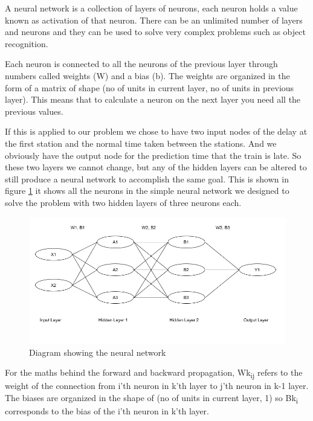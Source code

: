 \documentclass[11pt]{article}
\begin{document}
	A neural network is a collection of layers of neurons, each neuron holds a value known as activation of that neuron. There can be an unlimited number of layers and neurons and they can be used to solve very complex problems such as object recognition.
	
	Each neuron is connected to all the neurons of the previous layer through numbers called weights (W) and a bias (b). The weights are organized in the form of a matrix of shape (no of units in current layer, no of units in previous layer). This means that to calculate a neuron on the next layer you need all the previous values.
	
	If this is applied to our problem we chose to have two input nodes of the delay at the first station and the normal time taken between the stations. And we obviously have the output node for the prediction time that the train is late. So these two layers we cannot change, but any of the hidden layers can be altered to still produce a neural network to accomplish the same goal. This is shown in figure \ref{Img:NNDiagram} it shows all the neurons in the simple neural network we designed to solve the problem with two hidden layers of three neurons each.
	
	\begin{figure}[!htb]
		\begin{center}
			\includegraphics[width=1\textwidth]{Resources/PartTwo/NNDiagram.png}
			\caption{Diagram showing the neural network}
			\label{Img:NNDiagram}
		\end{center}
	\end{figure}
	
	For the maths behind the forward and backward propagation, Wk\textsubscript{ij} refers to the weight of the connection from i’th neuron in k'th layer to j’th neuron in k-1 layer. The biases are organized in the shape of (no of units in current layer, 1) so Bk\textsubscript{i} corresponds to the bias of the i’th neuron in k'th layer. 
	
\end{document}
